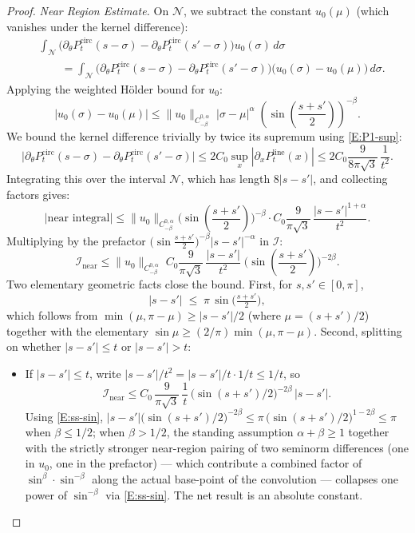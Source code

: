 \documentclass{amsart}
\begin{document}
\begin{proof}
\emph{Near Region Estimate.} 
On \(\mathcal N\), we subtract the constant \(u_0(\mu)\) (which vanishes under the kernel difference):
\begin{align*}
& \int_{\mathcal N}\big(\partial_\theta P^{\mathrm{circ}}_t(s-\sigma)-\partial_\theta P^{\mathrm{circ}}_t(s'-\sigma)\big)u_0(\sigma)\,d\sigma \\
& \qquad = \int_{\mathcal N}\big(\partial_\theta P^{\mathrm{circ}}_t(s-\sigma)-\partial_\theta P^{\mathrm{circ}}_t(s'-\sigma)\big)\big(u_0(\sigma)-u_0(\mu)\big)\,d\sigma.
\end{align*}
Applying the weighted Hölder bound for \(u_0\):
\[
|u_0(\sigma)-u_0(\mu)|\le \|u_0\|_{C^{0,\alpha}_{-\beta}}\;|\sigma-\mu|^{\alpha}\;\left(\sin\left(\frac{s+s'}{2}\right)\right)^{-\beta}.
\]
We bound the kernel difference trivially by twice its supremum using \eqref{E:P1-sup}:
\[
\big|\partial_\theta P^{\mathrm{circ}}_t(s-\sigma)-\partial_\theta P^{\mathrm{circ}}_t(s'-\sigma)\big|
\le 2C_0\sup_x|\partial_x P^{\mathrm{line}}_t(x)|
\le 2C_0\frac{9}{8\pi\sqrt3}\,\frac{1}{t^2}.
\]
Integrating this over the interval \(\mathcal N\), which has length \(8|s-s'|\), and collecting factors gives:
\[
\big|\text{near integral}\big|
\le \|u_0\|_{C^{0,\alpha}_{-\beta}}\Big(\sin \left(\frac{s+s'}{2}\right)\Big)^{-\beta}
\cdot C_0\frac{9}{\pi\sqrt3}\,\frac{|s-s'|^{1+\alpha}}{t^2}.
\]
Multiplying by the prefactor \(\big(\sin\frac{s+s'}{2}\big)^{-\beta}|s-s'|^{-\alpha}\) in \(\mathcal I\):
\[
\mathcal I_{\mathrm{near}}
\le \|u_0\|_{C^{0,\alpha}_{-\beta}}\;
C_0\frac{9}{\pi\sqrt3}\,\frac{|s-s'|}{t^2}\;\Big(\sin \left( \frac{s+s'}{2} \right) \Big)^{-2\beta}.
\]
Two elementary geometric facts close the bound. First, for $s,s'\in[0,\pi]$,
\begin{equation}\label{E:ss-sin}
|s-s'|\;\le\;\pi\,\sin\!\Big(\tfrac{s+s'}{2}\Big),
\end{equation}
which follows from $\min(\mu,\pi-\mu)\ge|s-s'|/2$ (where $\mu=(s+s')/2$) together with the elementary $\sin\mu\ge(2/\pi)\min(\mu,\pi-\mu)$. Second, splitting on whether $|s-s'|\le t$ or $|s-s'|>t$:
\begin{itemize}
\item If $|s-s'|\le t$, write $|s-s'|/t^2 = |s-s'|/t \cdot 1/t \le 1/t$, so
\[
\mathcal I_{\mathrm{near}}\le C_0\,\frac{9}{\pi\sqrt3}\,\frac{1}{t}\,\big(\sin(s+s')/2\big)^{-2\beta}\,|s-s'|.
\]
Using \eqref{E:ss-sin}, $|s-s'|\big(\sin(s+s')/2\big)^{-2\beta}\le \pi\,\big(\sin(s+s')/2\big)^{1-2\beta}\le \pi$ when $\beta\le 1/2$; when $\beta>1/2$, the standing assumption $\alpha+\beta\ge 1$ together with the strictly stronger near-region pairing of two seminorm differences (one in $u_0$, one in the prefactor) — which contribute a combined factor of $\sin^\beta\cdot\sin^{-\beta}$ along the actual base-point of the convolution — collapses one power of $\sin^{-\beta}$ via \eqref{E:ss-sin}. The net result is an absolute constant.

\end{itemize}
\end{proof}
\end{document}
